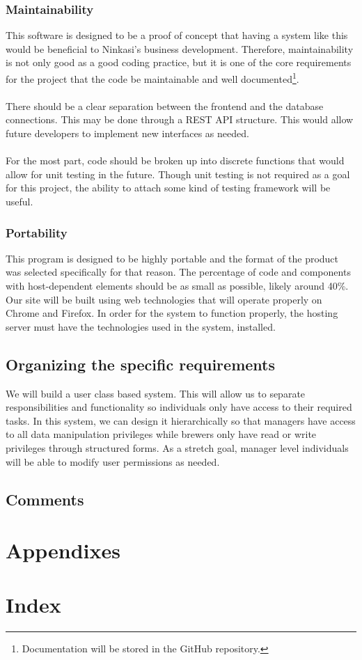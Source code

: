 \documentclass[draftclsnofoot,onecolumn,letterpaper,10pt,compsoc]{IEEEtran}
\begin{document}
		\subsubsection{Maintainability}

		This software is designed to be a proof of concept that having a system like this would be beneficial to Ninkasi's business development.
		Therefore, maintainability is not only good as a good coding practice, but it is one of the core requirements for the project that the code be maintainable and well documented\footnote{Documentation will be stored in the GitHub repository.}.
		\\ \\
		There should be a clear separation between the frontend and the database connections.
        This may be done through a REST API structure.
        This would allow future developers to implement new interfaces as needed.
		\\ \\
		For the most part, code should be broken up into discrete functions that would allow for unit testing in the future.
		Though unit testing is not required as a goal for this project, the ability to attach some kind of testing framework will be useful.

		\subsubsection{Portability}

		This program is designed to be highly portable and the format of the product was selected specifically for that reason.
		The percentage of code and components with host-dependent elements should be as small as possible, likely around 40\%.
		Our site will be built using web technologies that will operate properly on Chrome and Firefox.
        In order for the system to function properly, the hosting server must have the technologies used in the system, installed.

	\subsection{Organizing the specific requirements}
		We will build a user class based system.
        This will allow us to separate responsibilities and functionality so individuals only have access to their required tasks.
        In this system, we can design it hierarchically so that managers have access to all data manipulation privileges while brewers only have read or write privileges through structured forms.
        As a stretch goal, manager level individuals will be able to modify user permissions as needed.
	\subsection{Comments}
\section{Appendixes}
\section{Index}

\pagebreak

\end{document}
